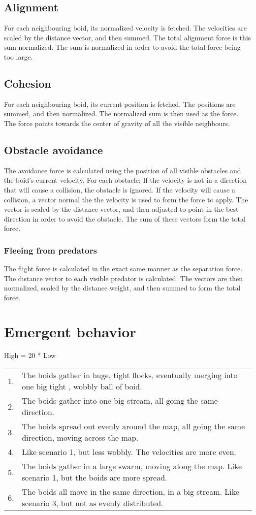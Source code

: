 \documentclass{article}
\begin{document}
\subsection{Alignment}
For each neighbouring boid, its normalized velocity is fetched. The velocities are scaled by the distance vector, and then summed. The total alignment force is this sum normalized. The sum is normalized in order to avoid the total force being too large.

\subsection{Cohesion}
For each neighbouring boid, its current position is fetched. The positions are summed, and then normalized. The normalized sum is then used as the force. The force points towards the center of gravity of all the visible neighbours.

\subsection{Obstacle avoidance}
The avoidance force is calculated using the position of all visible obstacles and the boid's current velocity. For each obstacle; If the velocity is not in a direction that will cause a collision, the obstacle is ignored. If the velocity will cause a collision, a vector normal the the velocity is used to form the force to apply. The vector is scaled by the distance vector, and then adjusted to point in the best direction in order to avoid the obstacle. The sum of these vectors form the total force.

\subsubsection{Fleeing from predators}
The flight force is calculated in the exact same manner as the separation force. The distance vector to each visible predator is calculated. The vectors are then normalized, scaled by the distance weight, and then summed to form the total force.

\section{Emergent behavior}
High = 20 * Low \\
\begin{tabulary}{\textwidth}{L L}
    1. & The boids gather in huge, tight flocks, eventually merging into one big tight , wobbly ball of boid.\\
    2. & The boids gather into one big stream, all going the same direction.\\
    3. & The boids spread out evenly around the map, all going the same direction, moving across the map.\\
    4. & Like scenario 1, but less wobbly. The velocities are more even.\\
    5. & The boids gather in a large swarm, moving along the map. Like scenario 1, but the boids are more spread.\\
    6. & The boids all move in the same direction, in a big stream. Like scenario 3, but not as evenly distributed.\\
\end{tabulary}
\end{document}
